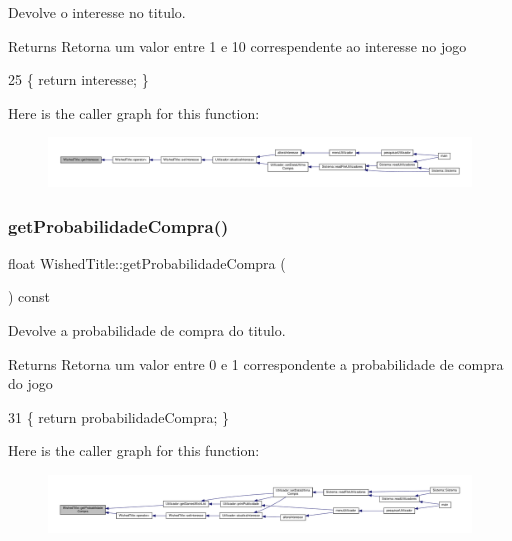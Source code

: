 Devolve o interesse no titulo. 

\begin{DoxyReturn}{Returns}
Retorna um valor entre 1 e 10 correspendente ao interesse no jogo 
\end{DoxyReturn}

\begin{DoxyCode}
25 \{ \textcolor{keywordflow}{return} interesse; \}
\end{DoxyCode}
Here is the caller graph for this function\+:
\nopagebreak
\begin{figure}[H]
\begin{center}
\leavevmode
\includegraphics[width=350pt]{classWishedTitle_af436ada1ae78a4ffc8031863c0f21859_icgraph}
\end{center}
\end{figure}
\mbox{\label{classWishedTitle_a9076a3f48cb0bbd435908c392e5041a9}} 
\subsubsection{\texorpdfstring{get\+Probabilidade\+Compra()}{getProbabilidadeCompra()}}
{\footnotesize\ttfamily float Wished\+Title\+::get\+Probabilidade\+Compra (\begin{DoxyParamCaption}{ }\end{DoxyParamCaption}) const\hspace{0.3cm}{\ttfamily [inline]}}



Devolve a probabilidade de compra do titulo. 

\begin{DoxyReturn}{Returns}
Retorna um valor entre 0 e 1 correspondente a probabilidade de compra do jogo 
\end{DoxyReturn}

\begin{DoxyCode}
31 \{ \textcolor{keywordflow}{return} probabilidadeCompra; \}
\end{DoxyCode}
Here is the caller graph for this function\+:
\nopagebreak
\begin{figure}[H]
\begin{center}
\leavevmode
\includegraphics[width=350pt]{classWishedTitle_a9076a3f48cb0bbd435908c392e5041a9_icgraph}
\end{center}
\end{figure}
\mbox{\label{classWishedTitle_a9ca6e92a26bb2f319a39d5a03b0c42bd}} 
